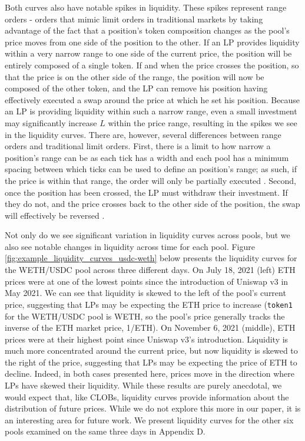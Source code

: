 \documentclass[11pt]{article}
\begin{document}
Both curves also have notable spikes in liquidity. These spikes represent range orders - orders that mimic limit orders in traditional markets by taking advantage of the fact that a position's token composition changes as the pool's price moves from one side of the position to the other. If an LP provides liquidity within a very narrow range to one side of the current price, the position will be entirely composed of a single token. If and when the price crosses the position, so that the price is on the other side of the range, the position will now be composed of the other token, and the LP can remove his position having effectively executed a swap around the price at which he set his position. Because an LP is providing liquidity within such a narrow range, even a small investment may significantly increase $L$ within the price range, resulting in the spikes we see in the liquidity curves. There are, however, several differences between range orders and traditional limit orders. First, there is a limit to how narrow a position’s range can be as each tick has a width and each pool has a minimum spacing between which ticks can be used to define an position's range; as such, if the price is within that range, the order will only be partially executed \citep{Uniswapv3}. Second, once the position has been crossed, the LP must withdraw their investment. If they do not, and the price crosses back to the other side of the position, the swap will effectively be reversed \citep{Uniswapv3}.

Not only do we see significant variation in liquidity curves across pools, but we also see notable changes in liquidity across time for each pool. Figure \ref{fig:example_liquidity_curves_usdc-weth} below presents the liquidity curves for the WETH/USDC pool across three different days. On July 18, 2021 (left) ETH prices were at one of the lowest points since the introduction of Uniswap v3 in May 2021. We can see that liquidity is skewed to the left of the pool's current price, suggesting that LPs may be expecting the ETH price to increase (\texttt{token1} for the WETH/USDC pool is WETH, so the pool's price generally tracks the inverse of the ETH market price, 1/ETH). On November 6, 2021 (middle), ETH prices were at their highest point since Uniswap v3's introduction. Liquidity is much more concentrated around the current price, but now liquidity is skewed to the right of the price, suggesting that LPs may be expecting the price of ETH to decline. Indeed, in both cases presented here, prices move in the direction where LPs have skewed their liquidity. While these results are purely  anecdotal, we would expect that, like CLOBs, liquidity curves provide information about the distribution of future prices. While we do not explore this more in our paper, it is an interesting area for future work. We present liquidity curves for the other six pools examined on the same three days in Appendix D.
\end{document}
